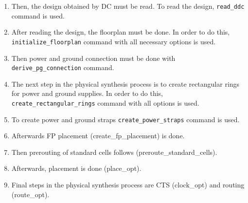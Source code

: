 \documentclass[a4paper,12pt,twoside]{article}
\begin{document}
\begin{enumerate}
\begin{enumerate}
        \item Then, the design obtained by DC must be read. To read the design, \texttt{read\_ddc} command is used.
        \item After reading the design, the floorplan must be done. In order to do this,\\
        \texttt{initialize\_floorplan} command with all necessary options is used.
        \item Then power and ground connection must be done with \texttt{derive\_pg\_connection} command.
        \item The next step in the physical synthesis process is to create rectangular rings for power and ground supplies. In order to do this, \texttt{create\_rectangular\_rings} command with all options is used.
        \item To create power and ground straps \texttt{create\_power\_straps} command is used.
        \item Afterwards FP placement (create\_fp\_placement) is done.
        \item Then prerouting of standard cells follows (preroute\_standard\_cells).
        \item Afterwards, placement is done (place\_opt).
        \item Final steps in the physical synthesis process are CTS (clock\_opt) and routing (route\_opt).
    \end{enumerate}
\end{enumerate}
\end{document}
